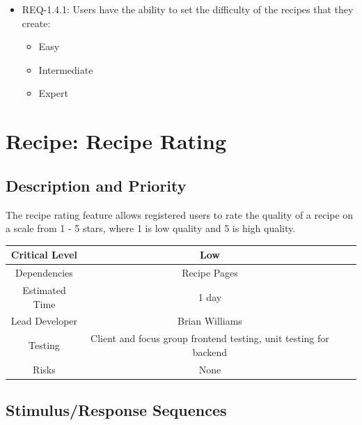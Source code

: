 \documentclass{scrreprt}
\begin{document}
\begin{itemize}
    \item REQ-1.4.1: Users have the ability to set the difficulty of the recipes that they create:
        \begin{itemize}
            \item Easy
            \item Intermediate
            \item Expert
        \end{itemize}
\end{itemize}

\section{Recipe: Recipe Rating}

\subsection{Description and Priority}

The recipe rating feature allows registered users to rate the quality of a recipe on a scale from 1 - 5 stars, where 1 is low quality and 5 is high quality.

\begin{center}
    \begin{tabular}{| c | c | c | c |}
        \hline
        Critical Level & Low                                                               \\
        \hline
        Dependencies   & Recipe Pages                                                      \\
        \hline
        Estimated Time & 1 day                                                             \\
        \hline
        Lead Developer & Brian Williams                                                    \\
        \hline
        Testing         & Client and focus group \gls{frontend} testing,
                          \gls{unit testing} for \gls{backend}                             \\
        \hline
        Risks          & None                                                              \\
        \hline
    \end{tabular}
\end{center}

\subsection{Stimulus/Response Sequences}
\end{document}
